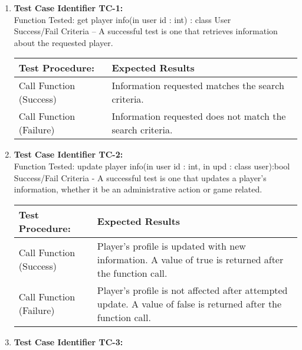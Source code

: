   \begin{enumerate}
  \item
    \textbf{Test Case Identifier TC-1:}\\

    Function Tested: get player info(in user id : int) : class User\\

    Success/Fail Criteria – A successful test is one that retrieves information
    about the requested player.\\

    \begin{longtable}{|p{2in}|p{4.5in}|}
    \hline
    {\large \color{color1}Test Procedure:}&{\large \color{color1}Expected Results}\\ \hline
    Call Function (Success) & Information requested matches the search criteria.
    \\ \hline
    Call Function (Failure) & Information requested does not match the search
    criteria. \\ \hline
    \end{longtable}
    \vspace{5mm}

  \item
    \textbf{Test Case Identifier TC-2:}\\

    Function Tested: update player info(in user id : int, in upd : class
        user):bool\\

    Success/Fail Criteria - A successful test is one that updates a player's
    information, whether it be an administrative action or game related.\\

    \begin{longtable}{|p{2in}|p{4.5in}|}
    \hline
    {\large \color{color1}Test Procedure:}&{\large \color{color1}Expected Results}\\ \hline
    Call Function (Success) & Player's profile is updated with new information.
    A value of true is returned after the function call. \\ \hline
    Call Function (Failure) & Player's profile is not affected after attempted
    update.  A value of false is returned after the function call.\\ \hline
    \end{longtable}
    \vspace{5mm}
 

  \item
    \textbf{Test Case Identifier TC-3:}\\


\end{enumerate}
